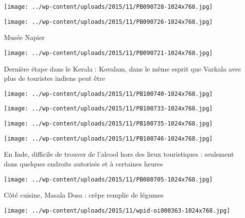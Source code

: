  \newline
\centerline{\texttt{[image: ../wp-content/uploads/2015/11/PB090728-1024x768.jpg]} } 
 \newline
 \newline
\centerline{\texttt{[image: ../wp-content/uploads/2015/11/PB090726-1024x768.jpg]} } 
 \newline
 Musée Napier \newline
 \newline
\centerline{\texttt{[image: ../wp-content/uploads/2015/11/PB090721-1024x768.jpg]} } 
 \newline
 Dernière étape dans le Kerala : Kovalam, dans le même esprit que Varkala avec plus de touristes indiens peut être \newline
 \newline
\centerline{\texttt{[image: ../wp-content/uploads/2015/11/PB100740-1024x768.jpg]} } 
 \newline
 \newline
\centerline{\texttt{[image: ../wp-content/uploads/2015/11/PB100733-1024x768.jpg]} } 
 \newline
 \newline
\centerline{\texttt{[image: ../wp-content/uploads/2015/11/PB100735-1024x768.jpg]} } 
 \newline
 \newline
\centerline{\texttt{[image: ../wp-content/uploads/2015/11/PB100746-1024x768.jpg]} } 
 \newline
 En Inde, difficile de trouver de l'alcool hors des lieux touristiques : seulement dans quelques endroits autorisés et à certaines heures \newline
 \newline
\centerline{\texttt{[image: ../wp-content/uploads/2015/11/PB080705-1024x768.jpg]} } 
 \newline
 Côté cuisine, Masala Dosa : crêpe remplie de légumes \newline
 \newline
\centerline{\texttt{[image: ../wp-content/uploads/2015/11/wpid-oi000363-1024x768.jpg]} } 
 \newline

\newpage
 
